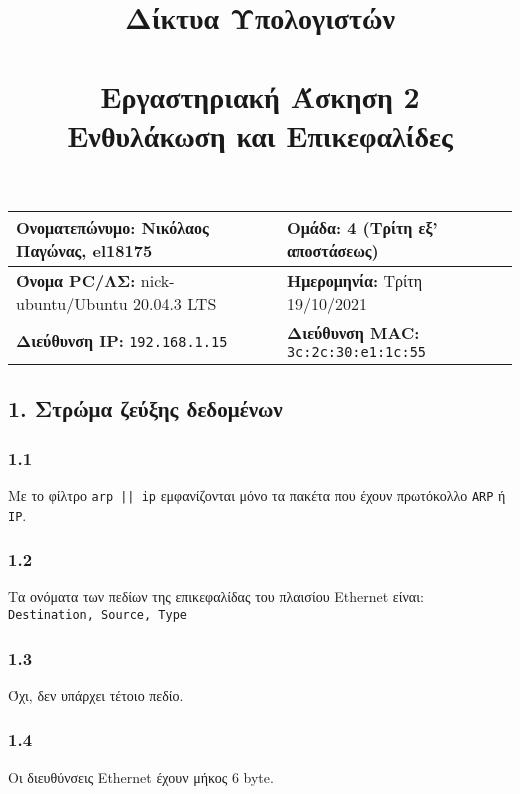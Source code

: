 

\newcommand{\imagesPath}{.}

\title{\textbf{Δίκτυα Υπολογιστών} \\~\\Εργαστηριακή Άσκηση 2 \\ Ενθυλάκωση και Επικεφαλίδες}
\author{}
\date{}


	\maketitle
	
	\begin{tabular}{|l|l|}
		\hline
		\textbf{Ονοματεπώνυμο:} Νικόλαος Παγώνας, el18175 & \textbf{Ομάδα:} 4 (Τρίτη εξ' αποστάσεως) \\
		\hline
		\textbf{Όνομα PC/ΛΣ:} nick-ubuntu/Ubuntu 20.04.3 LTS & \textbf{Ημερομηνία:} Τρίτη 19/10/2021  \\
		\hline
		\textbf{Διεύθυνση IP:} \verb|192.168.1.15| & \textbf{Διεύθυνση MAC:} \verb|3c:2c:30:e1:1c:55|\\
		\hline
	\end{tabular}

	\subsection*{1. Στρώμα ζεύξης δεδομένων}
		
		\subsubsection*{1.1}
			Με το φίλτρο \verb+arp || ip+ εμφανίζονται μόνο τα πακέτα που έχουν πρωτόκολλο \verb|ARP| ή \verb|IP|.  
		
		\subsubsection*{1.2}
			Τα ονόματα των πεδίων της επικεφαλίδας του πλαισίου Ethernet είναι: \verb|Destination, Source, Type|
		
		\subsubsection*{1.3}
			Όχι, δεν υπάρχει τέτοιο πεδίο.
		
		\subsubsection*{1.4}
			Οι διευθύνσεις Ethernet έχουν μήκος 6 byte.
		
